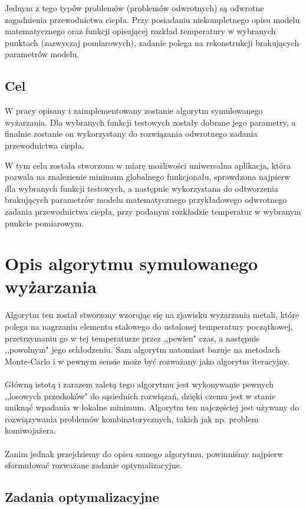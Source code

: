 \documentclass[twoside]{projektInzynierskiMS1}
\newcommand{\newLine}{~\\}
\newcommand{\si}{ś}
\begin{document}
Jednym z tego typów problemów (problemów odwrotnych) są odwrotne zagadnienia przewodnictwa ciepła. Przy posiadaniu niekompletnego opisu modelu matematycznego oraz funkcji opisującej rozkład temperatury w wybranych punktach (zazwyczaj pomiarowych), zadanie polega na rekonstrukcji brakujących parametrów modelu. 

\subsection{Cel}

W pracy opisany i zaimplementowany zostanie algorytm symulowanego wyżarzania. Dla wybranych funkcji testowych zostały dobrane jego parametry, a finalnie zostanie on wykorzystany do rozwiązania odwrotnego zadania przewodnictwa ciepła.

W tym celu została stworzona w miarę możliwo\si ci uniwersalna aplikacja, która pozwala na znalezienie minimum globalnego funkcjonału, sprawdzona najpierw dla wybranych funkcji testowych, a następnie wykorzystana do odtworzenia brakujących parametrów modelu matematycznego przykładowego odwrotnego zadania przewodnictwa ciepła, przy podanym rozkładzie temperatur w wybranym punkcie pomiarowym.


\section{Opis algorytmu symulowanego wyżarzania}
				Algorytm ten został stworzony wzorując się na zjawisku wyżarzania metali, które polega na nagrzaniu elementu stalowego do ustalonej temperatury początkowej, przetrzymaniu go w tej temperaturze przez ,,pewien" czas, a następnie ,,powolnym" jego schłodzeniu. Sam algorytm natomiast bazuje na metodach Monte-Carlo i w pewnym sensie może być rozważany jako algorytm iteracyjny.\\ \newLine
Główną istotą i zarazem zaletą tego algorytmu jest wykonywanie pewnych ,,losowych przeskoków" do sąsiednich rozwiązań, dzięki czemu jest w stanie uniknąć wpadania w lokalne minimum. Algorytm ten najczę\si ciej jest używany do rozwiązywania problemów kombinatorycznych, takich jak np. problem komiwojażera. \\ \newLine

Zanim jednak przejdziemy do opisu samego algorytmu, powinni\si my najpierw sformułować rozważane zadanie optymalizacyjne.

\subsection{Zadania optymalizacyjne}
\end{document}
